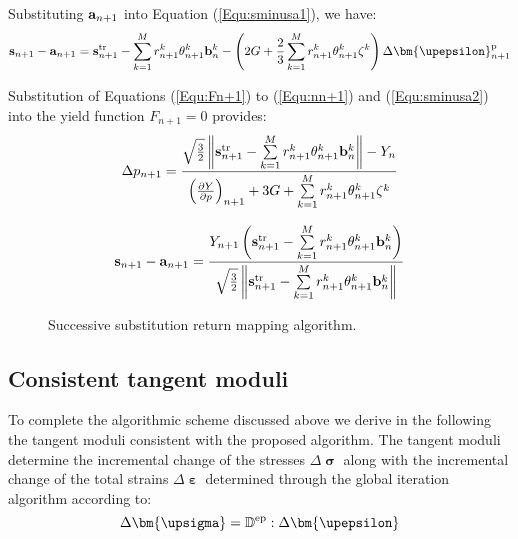 Substituting ${{\bf{a}}_{n + 1}}$ into Equation (\ref{Equ:sminusa1}), we have:
\begin{equation}
\label{Equ:sminusa2}
\begin{aligned}
{{{\bf{s}}_{n + 1}} - {{\bf{a}}_{n + 1}}}=
{\bf{s}}_{n + 1}^{\rm{tr}} - \sum\limits_{k = 1}^M {r_{n + 1}^k\theta _{n + 1}^k{\bf{b}}_n^k}
- \left( {2G + \frac{2}{3}\sum\limits_{k = 1}^M {r_{n + 1}^k\theta _{n + 1}^k{\zeta ^k}} } \right)\Delta {\bm{\upepsilon }}_{n + 1}^{\rm{p}}
\end{aligned}
\end{equation}

Substitution of Equations (\ref{Equ:Fn+1}) to (\ref{Equ:nn+1}) and (\ref{Equ:sminusa2}) into the yield function ${F_{n + 1}} = 0$ provides:
\begin{equation}
\Delta {p_{n + 1}} = \frac{{\sqrt {\frac{3}{2}} \left\| {{\bf{s}}_{n + 1}^{\rm{tr}} - \sum\limits_{k = 1}^M {r_{n + 1}^k\theta _{n + 1}^k{\bf{b}}_n^k} } \right\| - {Y_n}}}{{{{\left( {\frac{{\partial Y}}{{\partial p}}} \right)}_{n + 1}} + 3G + \sum\limits_{k = 1}^M {r_{n + 1}^k\theta _{n + 1}^k{\zeta ^k}} }}
\end{equation}

\begin{equation}
{{\bf{s}}_{n + 1}} - {{\bf{a}}_{n + 1}} = \frac{{{Y_{n + 1}}\left( {{\bf{s}}_{n + 1}^{\rm{tr}} - \sum\limits_{k = 1}^M {r_{n + 1}^k\theta _{n + 1}^k{\bf{b}}_n^k} } \right)}}{{\sqrt {\frac{3}{2}} \left\| {{\bf{s}}_{n + 1}^{\rm{tr}} - \sum\limits_{k = 1}^M {r_{n + 1}^k\theta _{n + 1}^k{\bf{b}}_n^k} } \right\|}}
\end{equation}
\begin{figure}[!htp]
\centering{}
\caption{Successive substitution return mapping algorithm.}
\label{Fig:radial_return_map}
\end{figure}

\subsection{Consistent tangent moduli}
\noindent
To complete the algorithmic scheme discussed above we derive in the following the tangent moduli consistent with the proposed algorithm. The tangent moduli determine the incremental change of the stresses $\Delta {\bm{\upsigma }}$ along with the incremental change of the total strains $\Delta {\bm{\upepsilon }}$ determined through the global iteration algorithm according to:
\begin{equation}
\Delta {\bm{\upsigma }} = {\mathbb{D}^{\rm{ep}}}:\Delta {\bm{\upepsilon }}
\end{equation}

